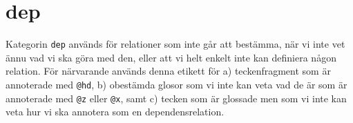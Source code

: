 \documentclass[11pt,a4paper]{article}
\begin{document}
\section{dep}
Kategorin \texttt{dep} används för relationer som inte går att bestämma, när vi inte vet ännu vad vi ska göra med den, eller att vi helt enkelt inte kan definiera någon relation. För närvarande används denna etikett för a) teckenfragment som är annoterade med \texttt{@hd}, b) obestämda glosor som vi inte kan veta vad de är som är annoterade med \texttt{@z} eller \texttt{@x}, samt c) tecken som är glossade men som vi inte kan veta hur vi ska annotera som en dependensrelation.












\end{document}
